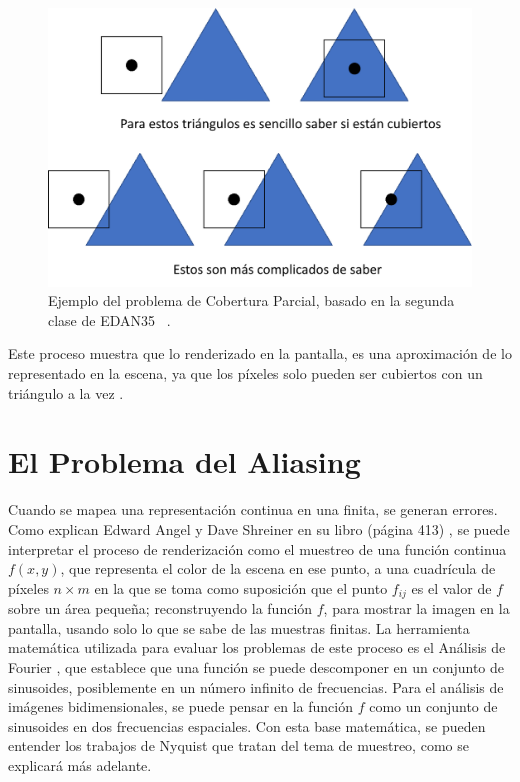\documentclass[pregrado]{tesis-usb} %
\begin{document}
\begin{figure}[!hbt]
	\centering
	\includegraphics[scale=0.5]{images/edge_testing.png} 
	\caption{Ejemplo del problema de Cobertura Parcial, basado en la segunda clase de EDAN35 ~\cite{Doggett2017EDAN35}. }\label{fig:partialcover}
\end{figure}

Este proceso muestra que lo renderizado en la pantalla, es una aproximación de lo representado en la escena, ya que los píxeles solo pueden ser cubiertos con un triángulo a la vez \cite{Moller2007, Doggett2017EDAN35}.


\section{El Problema del Aliasing}
Cuando se mapea una representación continua en una finita, se generan errores. Como explican Edward Angel y Dave Shreiner en su libro (página 413) \cite{Shreiner2011}, se puede interpretar el proceso de renderización como el muestreo de una función continua $f(x, y)$, que representa el color de la escena en ese punto, a una cuadrícula de píxeles $n\times m$ en la que se toma como suposición que el punto $f_{ij}$ es el valor de $f$ sobre un área pequeña; reconstruyendo la función $f$, para mostrar la imagen en la pantalla, usando solo lo que se sabe de las muestras finitas. La herramienta matemática utilizada para evaluar los problemas de este proceso es el Análisis de Fourier \cite{Shreiner2011}, que establece que una función se puede descomponer en un conjunto de sinusoides, posiblemente en un número infinito de frecuencias. Para el análisis de imágenes bidimensionales, se puede pensar en la función $f$ como un conjunto de sinusoides en dos frecuencias espaciales. Con esta base matemática, se pueden entender los trabajos de Nyquist \cite{Shreiner2011} que tratan del tema de muestreo, como se explicará más adelante. 
\end{document}

